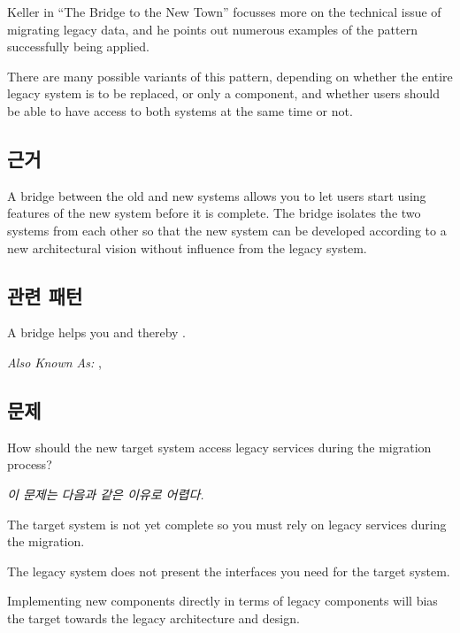 \documentclass[a4paper,10pt,twoside]{book}
\begin{document}
Keller in ``The Bridge to the New Town'' \cite{Kell00a} focusses more on the technical issue of migrating legacy data, and he points out numerous examples of the pattern successfully being applied.

There are many possible variants of this pattern, depending on whether the entire legacy system is to be replaced, or only a component, and whether users should be able to have access to both systems at the same time or not.

\subsection*{근거}

A bridge between the old and new systems allows you to let users start using features of the new system before it is complete. The bridge isolates the two systems from each other so that the new system can be developed according to a new architectural vision without influence from the legacy system.

\subsection*{관련 패턴}

A bridge helps you  and thereby .


\emph{Also Known As:}   \cite{Ocal00a},  \cite{Foot00a}


\subsection*{문제}

How should the new target system access legacy services during the migration process?

\emph{이 문제는 다음과 같은 이유로 어렵다.}

\begin{bulletlist}
\item The target system is not yet complete so you must rely on legacy services during the migration. 

\item The legacy system does not present the interfaces you need for the target system.

\item Implementing new components directly in terms of legacy components will bias the target towards the legacy architecture and design.
\end{bulletlist}
\end{document}
